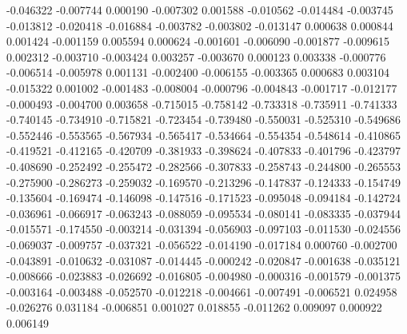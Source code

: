 -0.046322
-0.007744
0.000190
-0.007302
0.001588
-0.010562
-0.014484
-0.003745
-0.013812
-0.020418
-0.016884
-0.003782
-0.003802
-0.013147
0.000638
0.000844
0.001424
-0.001159
0.005594
0.000624
-0.001601
-0.006090
-0.001877
-0.009615
0.002312
-0.003710
-0.003424
0.003257
-0.003670
0.000123
0.003338
-0.000776
-0.006514
-0.005978
0.001131
-0.002400
-0.006155
-0.003365
0.000683
0.003104
-0.015322
0.001002
-0.001483
-0.008004
-0.000796
-0.004843
-0.001717
-0.012177
-0.000493
-0.004700
0.003658
-0.715015
-0.758142
-0.733318
-0.735911
-0.741333
-0.740145
-0.734910
-0.715821
-0.723454
-0.739480
-0.550031
-0.525310
-0.549686
-0.552446
-0.553565
-0.567934
-0.565417
-0.534664
-0.554354
-0.548614
-0.410865
-0.419521
-0.412165
-0.420709
-0.381933
-0.398624
-0.407833
-0.401796
-0.423797
-0.408690
-0.252492
-0.255472
-0.282566
-0.307833
-0.258743
-0.244800
-0.265553
-0.275900
-0.286273
-0.259032
-0.169570
-0.213296
-0.147837
-0.124333
-0.154749
-0.135604
-0.169474
-0.146098
-0.147516
-0.171523
-0.095048
-0.094184
-0.142724
-0.036961
-0.066917
-0.063243
-0.088059
-0.095534
-0.080141
-0.083335
-0.037944
-0.015571
-0.174550
-0.003214
-0.031394
-0.056903
-0.097103
-0.011530
-0.024556
-0.069037
-0.009757
-0.037321
-0.056522
-0.014190
-0.017184
0.000760
-0.002700
-0.043891
-0.010632
-0.031087
-0.014445
-0.000242
-0.020847
-0.001638
-0.035121
-0.008666
-0.023883
-0.026692
-0.016805
-0.004980
-0.000316
-0.001579
-0.001375
-0.003164
-0.003488
-0.052570
-0.012218
-0.004661
-0.007491
-0.006521
0.024958
-0.026276
0.031184
-0.006851
0.001027
0.018855
-0.011262
0.009097
0.000922
0.006149
